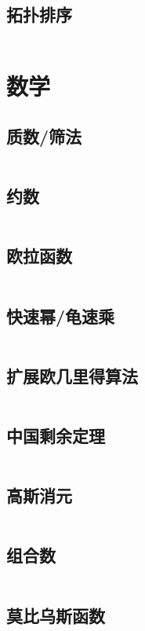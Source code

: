 \documentclass[a4paper,12pt]{article}
\begin{document}
\subsection{拓扑排序} %
\inputminted[breaklines, linenos]{c++}{graph/topsort/top.cc}

\newpage
\section{数学}
\subsection{质数/筛法}
\inputminted[breaklines, linenos]{c++}{math/prime.cc}
\subsection{约数}
\inputminted[breaklines, linenos]{c++}{math/yueshu.cc}
\subsection{欧拉函数}
\inputminted[breaklines, linenos]{c++}{math/eluer.cc}
\subsection{快速幂/龟速乘}
\inputminted[breaklines, linenos]{c++}{math/qmi.cc}
\subsection{扩展欧几里得算法}
\inputminted[breaklines, linenos]{c++}{math/exgcd.cc}
\subsection{中国剩余定理}
\inputminted[breaklines, linenos]{c++}{math/crt.cc}
\subsection{高斯消元}
\inputminted[breaklines, linenos]{c++}{math/gauss.cc}
\subsection{组合数}
\inputminted[breaklines, linenos]{c++}{math/combine.cc}
\subsection{莫比乌斯函数}
\inputminted[breaklines, linenos]{c++}{math/mobius.cc}
\end{document}
